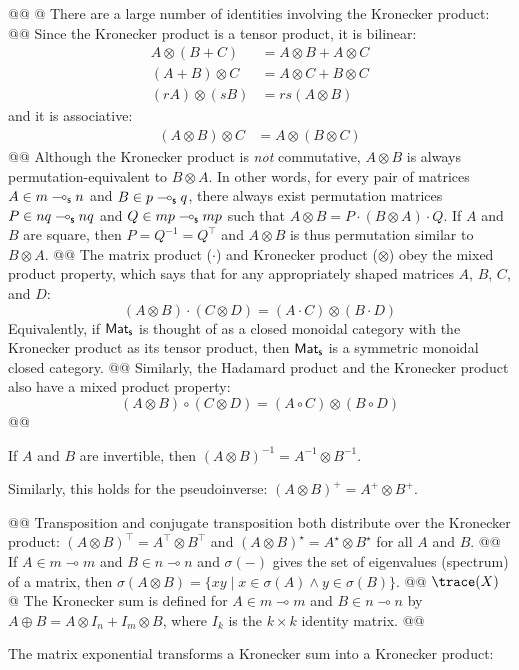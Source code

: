 \documentclass[]{article}
\newcommand{\textbs}[1]{{\sffamily\fontseries{sbc}\selectfont #1}}
\newcommand{\mathbs}[1]{\ensuremath{\text{\textbs{#1}}}}
\newcommand{\mbs}[1]{\ensuremath{\mathbs{#1}}}     %
\newcommand{\msf}[1]{\ensuremath{\mathsf{#1}}}     %
\newcommand{\define}[1]{\textbs{#1}}
\begin{document}
\begin{easylist}[itemize]
{}
@@ {%
}
@ There are a large number of identities involving the Kronecker product:
@@ {%
  Since the Kronecker product is a tensor product, it is bilinear:
  \begin{align*}
    A \otimes (B + C)       & = A \otimes B + A \otimes C \\
    (A + B) \otimes C       & = A \otimes C + B \otimes C \\
    (r A) \otimes (s B)     & = r s (A \otimes B)
  \end{align*}
  and it is associative:
  \begin{align*}
    (A \otimes B) \otimes C & = A \otimes (B \otimes C)
  \end{align*}
  \vspace{-2em}
}
@@ {%
  Although the Kronecker product is \textit{not} commutative, $A \otimes B$
  is always permutation-equivalent to $B \otimes A$.
  In other words, for every pair of matrices $A \in m \multimap_\mbs{s} n$
  and $B \in p \multimap_\mbs{s} q$, there always exist permutation matrices
  $P \in n q \multimap_\mbs{s} n q$ and $Q \in m p \multimap_\mbs{s} m p$
  such that $A \otimes B = P \cdot (B \otimes A) \cdot Q$. If $A$ and $B$ are
  square, then $P = Q^{-1} = Q^\top$ and $A \otimes B$ is thus permutation
  similar to $B \otimes A$.
}
@@ {%
  The matrix product ($\cdot$) and Kronecker product ($\otimes$) obey the
  \define{mixed product property}, which says that for any appropriately
  shaped matrices $A$, $B$, $C$, and $D$:
  \begin{equation*}
  (A \otimes B) \cdot (C \otimes D) = (A \cdot C) \otimes (B \cdot D)
  \end{equation*}
  Equivalently, if $\msf{Mat}_\mbs{s}$ is thought of as a closed monoidal
  category with the Kronecker product as its tensor product, then
  $\msf{Mat}_\mbs{s}$ is a symmetric monoidal closed category.
}
@@ {%
  Similarly, the Hadamard product and the Kronecker product also have a mixed
  product property:
  \begin{equation*}
  (A \otimes B) \circ (C \otimes D) = (A \circ C) \otimes (B \circ D)
  \end{equation*}
}
@@ {%
  If $A$ and $B$ are invertible, then $(A \otimes B)^{-1} = A^{-1} \otimes B^{-1}$.

  Similarly, this holds for the pseudoinverse:
  $(A \otimes B)^{+} = A^{+} \otimes B^{+}$.
}
@@ {%
  Transposition and conjugate transposition both distribute over the Kronecker
  product: ${(A \otimes B)}^{\top} = A^\top \otimes B^\top$ and
  ${(A \otimes B)}^{\star} = A^\star \otimes B^\star$ for all $A$ and $B$.
}
@@ {%
  If $A \in m \multimap m$ and $B \in n \multimap n$ and $\sigma(-)$ gives the
  set of eigenvalues (spectrum) of a matrix, then
  $\sigma(A \otimes B) = \{xy \mid x \in \sigma(A) \land y \in \sigma(B)\}$.
}
@@ {%
  $\trace(X)$
}
@ {%
  The \define{Kronecker sum} is defined for $A \in m \multimap m$ and
  $B \in n \multimap n$ by $A \oplus B = A \otimes I_n + I_m \otimes B$,
  where $I_k$ is the $k \times k$ identity matrix.
}
@@ {%
  The matrix exponential transforms a Kronecker sum into a Kronecker product:

}
\end{easylist}
\end{document}

